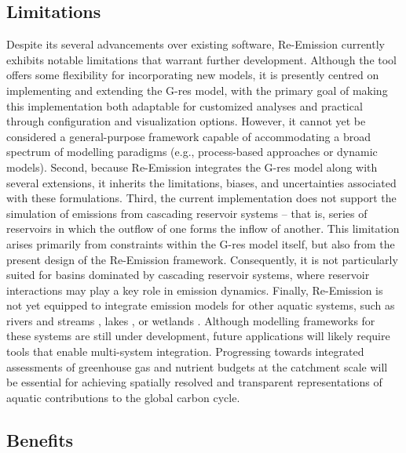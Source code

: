\documentclass[review, authoryear, 1p]{elsarticle} %
\begin{document}
\subsection{Limitations}
\label{subsec:limitations}

Despite its several advancements over existing software, Re-Emission currently exhibits notable limitations that warrant further development.
Although the tool offers some flexibility for incorporating new models, it is presently centred on implementing and extending the G-res model, with the primary goal of making this implementation both adaptable for customized analyses and practical through configuration and visualization options.
However, it cannot yet be considered a general-purpose framework capable of accommodating a broad spectrum of modelling paradigms (e.g., process-based approaches or dynamic models).
Second, because Re-Emission integrates the G-res model along with several extensions, it inherits the limitations, biases, and uncertainties associated with these formulations.
Third, the current implementation does not support the simulation of emissions from cascading reservoir systems -- that is, series of reservoirs in which the outflow of one forms the inflow of another.
This limitation arises primarily from constraints within the G-res model itself, but also from the present design of the Re-Emission framework.
Consequently, it is not particularly suited for basins dominated by cascading reservoir systems, where reservoir interactions may play a key role in emission dynamics.
Finally, Re-Emission is not yet equipped to integrate emission models for other aquatic systems, such as rivers and streams \citep{Rocher-Ros2023}, lakes \citep{Zhuang2023}, or wetlands \citep{Hu2024}.
Although modelling frameworks for these systems are still under development, future applications will likely require tools that enable multi-system integration.
Progressing towards integrated assessments of greenhouse gas and nutrient budgets at the catchment scale will be essential for achieving spatially resolved and transparent representations of aquatic contributions to the global carbon cycle.

\subsection{Benefits}
\label{subsec:benefits}
\end{document}
